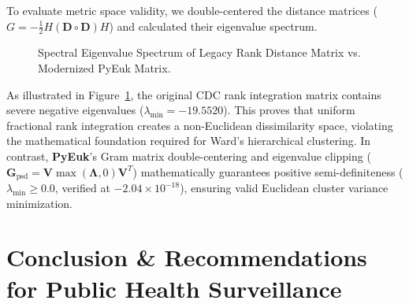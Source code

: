 \documentclass[11pt,a4paper]{article}
\begin{document}
To evaluate metric space validity, we double-centered the distance matrices ($G = -\frac{1}{2} H (\mathbf{D} \circ \mathbf{D}) H$) and calculated their eigenvalue spectrum.

\begin{figure}[h]
\centering
{}
\caption{Spectral Eigenvalue Spectrum of Legacy Rank Distance Matrix vs. Modernized PyEuk Matrix.}
\label{fig:eigen_spectrum}
\end{figure}

As illustrated in Figure~\ref{fig:eigen_spectrum}, the original CDC rank integration matrix contains severe negative eigenvalues ($\lambda_{\text{min}} = -19.5520$). This proves that uniform fractional rank integration creates a non-Euclidean dissimilarity space, violating the mathematical foundation required for Ward's hierarchical clustering.
In contrast, \textbf{PyEuk}'s Gram matrix double-centering and eigenvalue clipping ($\mathbf{G}_{\text{psd}} = \mathbf{V} \max(\mathbf{\Lambda}, 0) \mathbf{V}^T$) mathematically guarantees positive semi-definiteness ($\lambda_{\text{min}} \ge 0.0$, verified at $-2.04 \times 10^{-18}$), ensuring valid Euclidean cluster variance minimization.

\section{Conclusion \& Recommendations for Public Health Surveillance}
\end{document}
